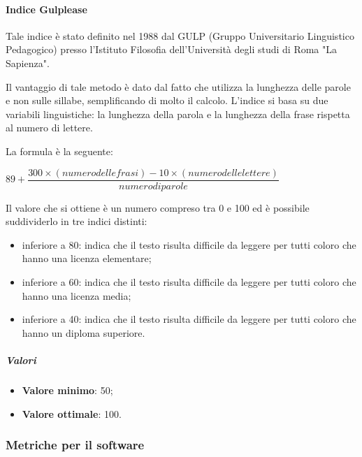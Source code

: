 \paragraph*{Indice Gulplease}
Tale indice è stato definito nel 1988 dal GULP (Gruppo Universitario Linguistico Pedagogico) presso l'Istituto Filosofia dell'Università degli studi di Roma "La Sapienza".

Il vantaggio di tale metodo è dato dal fatto che utilizza la lunghezza delle parole e non sulle sillabe, semplificando di molto il calcolo. L'indice si basa su due variabili linguistiche: la lunghezza della parola e la lunghezza della frase rispetta al numero di lettere.

La formula è la seguente:
\begin{center}
$89+\dfrac{300\times(numerodellefrasi)-10\times(numero delle lettere)}{numero di parole}$
\end{center}
Il valore che si ottiene è un numero compreso tra 0 e 100 ed è possibile suddividerlo in tre indici distinti:
\begin{itemize}
	\item inferiore a 80: indica che il testo risulta difficile da leggere per tutti coloro che hanno una licenza elementare;
	\item inferiore a 60: indica che il testo risulta difficile da leggere per tutti coloro che hanno una licenza media;
	\item inferiore a 40: indica che il testo risulta difficile da leggere per tutti coloro che hanno un diploma superiore.
\end{itemize}
\subparagraph{Valori}
\begin{itemize}
	\item \textbf{Valore minimo}: 50;
	\item \textbf{Valore ottimale}: 100.
\end{itemize}
\subsubsection{Metriche per il software}